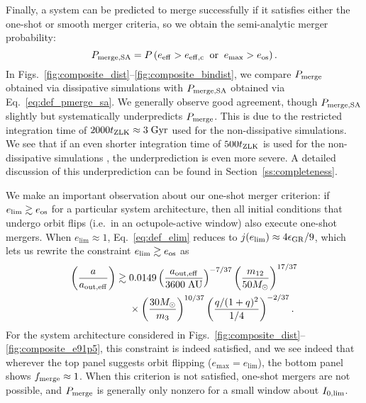 \documentclass[
        fleqn,
        usenatbib,
    ]{mnras}
\newcommand*{\p}[1]{\left(#1\right)}
\begin{document}
Finally, a system can be predicted to merge successfully if it satisfies either
the one-shot or smooth merger criteria, so we obtain the semi-analytic merger
probability:
\begin{equation}
    P_{\rm merge, SA} = P\p{e_{\rm eff} > e_{\rm eff, c} \;\;\text{or}\;\;
        e_{\max} > e_{\rm os}}.\label{eq:def_pmerge_sa}
\end{equation}
In Figs.~\ref{fig:composite_dist}--\ref{fig:composite_bindist}, we compare
$P_{\rm merge}$ obtained via dissipative simulations with $P_{\rm merge, SA}$
obtained via Eq.~\eqref{eq:def_pmerge_sa}. We generally observe good
agreement, though $P_{\rm merge, SA}$ slightly but systematically underpredicts
$P_{\rm merge}$. This is due to the restricted integration time of $2000 t_{\rm
ZLK} \approx 3\;\mathrm{Gyr}$ used for the non-dissipative simulations. We see
that if an even shorter integration time of $500 t_{\rm ZLK}$ is used for the
non-dissipative simulations \citep[as is used in][]{oconnor_wd}, the
underprediction is even more severe. A detailed discussion of this
underprediction can be found in Section~\ref{ss:completeness}.

We make an important observation about our one-shot merger criterion: if
$e_{\lim} \gtrsim e_{\rm os}$ for a particular system architecture, then all
initial conditions that undergo orbit flips (i.e.\ in an octupole-active window)
also execute one-shot mergers. When $e_{\lim} \approx 1$,
Eq.~\eqref{eq:def_elim} reduces to $j(e_{\lim}) \approx 4\epsilon_{\rm GR} / 9$,
which lets us rewrite the constraint $e_{\lim} \gtrsim e_{\rm os}$ as
\begin{align}
    \p{\frac{a}{a_{\rm out, eff}}} \gtrsim{}&
        0.0149
        \p{\frac{a_{\rm out, eff}}{3600\;\mathrm{AU}}}^{-7/37}
        \p{\frac{m_{12}}{50M_{\odot}}}^{17/37}\nonumber\\
        &\times\p{\frac{30M_{\odot}}{m_3}}^{10/37}
        \p{\frac{q / (1 + q)^2}{1/4}}^{-2/37}.\label{eq:q_237}
\end{align}
For the system architecture considered in
Figs.~\ref{fig:composite_dist}--\ref{fig:composite_e91p5}, this constraint is
indeed satisfied, and we see indeed that wherever the top panel suggests orbit
flipping ($e_{\max} = e_{\lim}$), the bottom panel shows $f_{\rm merge} \approx
1$. When this criterion is not satisfied, one-shot mergers are not
possible, and $P_{\rm merge}$ is generally only nonzero for a small window about
$I_{\rm 0, \lim}$.
\end{document}
